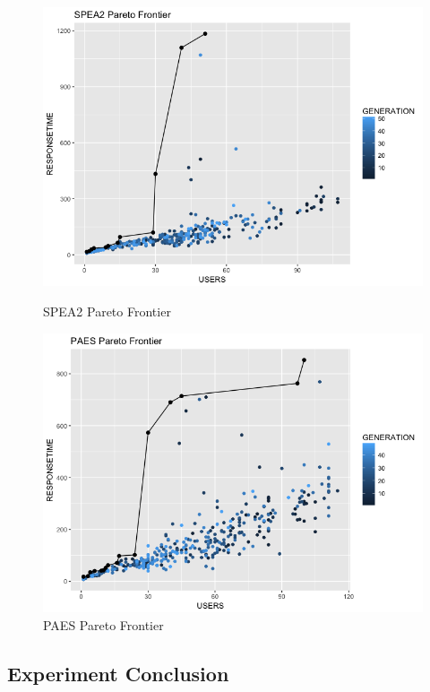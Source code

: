 \documentclass[espaco=umemeio,chapter=TITLE,twoside,openright]{abnt}
\begin{document}
\begin{figure}[h]
\begin{minipage}{.5\textwidth}
\centering
\includegraphics[width=1\textwidth]{./images/spea2noise.png}
\caption{SPEA2 Pareto Frontier}
\label{fig:spea2}
\end{minipage}
\begin{minipage}{.5\textwidth}
\centering
\includegraphics[width=1\textwidth]{./images/paesnoise.png}
\caption{PAES Pareto Frontier}
\label{fig:paes}
\end{minipage}
\end{figure}

\subsection{Experiment Conclusion}
\end{document}

